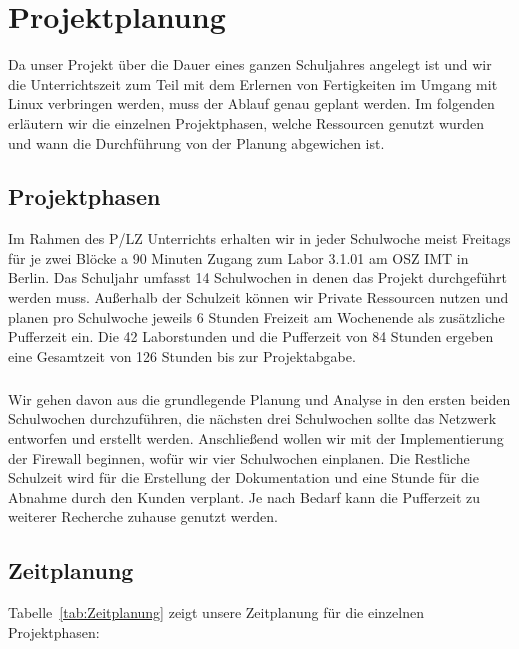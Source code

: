 \section{Projektplanung} 
\label{sec:Projektplanung}

Da unser Projekt über die Dauer eines ganzen Schuljahres angelegt ist und wir die Unterrichtszeit zum Teil mit dem Erlernen von Fertigkeiten im Umgang mit Linux verbringen werden, muss der Ablauf genau geplant werden. Im folgenden erläutern wir die einzelnen Projektphasen, welche Ressourcen genutzt wurden und wann die Durchführung von der Planung abgewichen ist.

\subsection{Projektphasen}
\label{sec:Projektphasen}

    Im Rahmen des P/LZ Unterrichts erhalten wir in jeder Schulwoche meist Freitags für je zwei Blöcke a 90 Minuten Zugang zum Labor 3.1.01 am OSZ IMT in Berlin. Das Schuljahr umfasst 14 Schulwochen in denen das Projekt durchgeführt werden muss. Außerhalb der Schulzeit können wir Private Ressourcen nutzen und planen pro Schulwoche jeweils 6 Stunden Freizeit am Wochenende als zusätzliche Pufferzeit ein. Die 42 Laborstunden und die Pufferzeit von 84 Stunden ergeben eine Gesamtzeit von 126 Stunden bis zur Projektabgabe.
\subparagraph{} Wir gehen davon aus die grundlegende Planung und Analyse in den ersten beiden Schulwochen durchzuführen, die nächsten drei Schulwochen sollte das Netzwerk entworfen und erstellt werden. Anschließend wollen wir mit der Implementierung der Firewall beginnen, wofür wir \ca vier Schulwochen einplanen. Die Restliche Schulzeit wird für die Erstellung der Dokumentation und eine Stunde für die Abnahme durch den Kunden verplant. Je nach Bedarf kann die Pufferzeit zu weiterer Recherche zuhause genutzt werden.

\subsection{Zeitplanung}
\label{sec:Zeitplanung}

Tabelle~\ref{tab:Zeitplanung} zeigt unsere Zeitplanung für die einzelnen Projektphasen:

